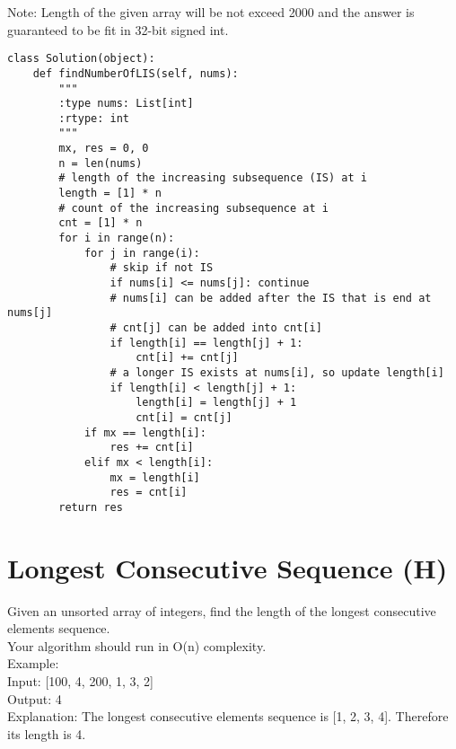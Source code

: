 Note: Length of the given array will be not exceed 2000 and the answer is guaranteed to be fit in 32-bit signed int. \\
\begin{lstlisting}
class Solution(object):
    def findNumberOfLIS(self, nums):
        """
        :type nums: List[int]
        :rtype: int
        """
        mx, res = 0, 0
        n = len(nums)
        # length of the increasing subsequence (IS) at i
        length = [1] * n
        # count of the increasing subsequence at i 
        cnt = [1] * n
        for i in range(n):
            for j in range(i):
                # skip if not IS
                if nums[i] <= nums[j]: continue
                # nums[i] can be added after the IS that is end at nums[j]
                # cnt[j] can be added into cnt[i]
                if length[i] == length[j] + 1:
                    cnt[i] += cnt[j]
                # a longer IS exists at nums[i], so update length[i]
                if length[i] < length[j] + 1:
                    length[i] = length[j] + 1
                    cnt[i] = cnt[j]
            if mx == length[i]:
                res += cnt[i]
            elif mx < length[i]:
                mx = length[i]
                res = cnt[i]
        return res
\end{lstlisting}

\section{Longest Consecutive Sequence (H)}
Given an unsorted array of integers, find the length of the longest consecutive elements sequence.\\

Your algorithm should run in O(n) complexity.\\

Example:\\

Input: [100, 4, 200, 1, 3, 2]\\
Output: 4\\
Explanation: The longest consecutive elements sequence is [1, 2, 3, 4]. Therefore its length is 4.\\

